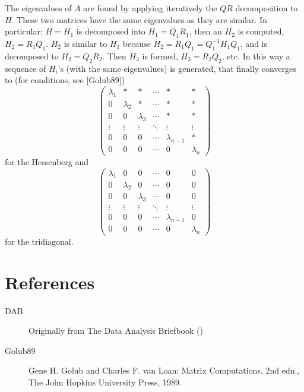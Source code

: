 \documentclass[12pt]{article}
\begin{document}
The eigenvalues of $A$ are found by applying iteratively the $QR$ decomposition to $H$. These two matrices have the same eigenvalues as they are similar.
In particular: $H = H_1$ is decomposed into $H_1 = Q_1R_1$, then an $H_2$ is computed, $H_2 = R_1Q_1$. $H_2$ is similar to $H_1$ because $H_2 = R_1Q_1 = Q_1^{-1}H_1Q_1$, and is decomposed to $H_2 = Q_2R_2$. Then $H_3$ is formed, $H_3 = R_2Q_2$, etc. In this way a sequence of $H_i$'s (with the same eigenvalues) is generated, that finally converges to (for conditions, see [Golub89])
\[
\begin{pmatrix}
 \lambda_1 & * & * & \cdots & * & * \\
 0 & \lambda_2 & * & \cdots & * & * \\
 0 & 0 & \lambda_3 & \cdots & * & * \\
 \vdots & \vdots & \vdots & \ddots & \vdots & \vdots \\
 0 & 0 & 0 & \cdots & \lambda_{n-1} & * \\
 0 & 0 & 0 & \cdots & 0 & \lambda_n 
\end{pmatrix}
\]
for the Hessenberg and
\[
\begin{pmatrix}
 \lambda_1 & 0 & 0 & \cdots & 0 & 0 \\
 0 & \lambda_2 & 0 & \cdots & 0 & 0 \\
 0 & 0 & \lambda_3 & \cdots & 0 & 0 \\
 \vdots & \vdots & \vdots & \ddots & \vdots & \vdots \\
 0 & 0 & 0 & \cdots & \lambda_{n-1} & 0 \\
 0 & 0 & 0 & \cdots & 0 & \lambda_n
\end{pmatrix}
\]
for the tridiagonal.

\section*{References}


\begin{description}
\item[DAB] Originally from The Data Analysis Briefbook
()
\item[Golub89]
Gene H. Golub and Charles F. van Loan: Matrix Computations, 2nd edn., The John Hopkins University Press, 1989.
\end{description}
\end{document}
